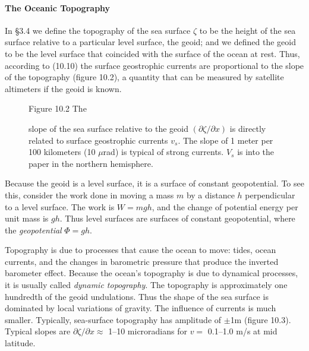 \paragraph{The Oceanic Topography}
In \S 3.4 we define the topography of
the sea surface $\zeta$ to be the height of the sea surface relative
to a particular level surface, the
geoid; and we defined the geoid to be the
level surface that coincided with the surface of
the ocean at rest.  Thus, according to (10.10) the surface geostrophic
currents are proportional to the slope of the topography (figure
10.2), a quantity that can be measured by satellite altimeters if the
geoid is known.

\begin{figure}[h!]
\vspace{-2ex}
\footnotesize
Figure 10.2 The \rule{0mm}{3ex}slope of the sea surface relative to
the geoid $(\partial\zeta/\partial x)$ is directly
related to surface geostrophic currents $v_s$.  The slope of 1 meter
per 100 kilometers (10 $\mu$rad) is typical of strong currents.  $V_s$
is into the paper in the northern hemisphere.
\label{fig:geostrophicsketch}
\vspace{-2ex}
\end{figure}

Because the geoid is a level surface, it is a surface of constant geopotential. To see this,
consider the work done in moving a mass $m$ by a distance $h$
perpendicular to a level surface. The work is
$W=mgh$, and the change of potential energy per unit mass is
$gh$. Thus level surfaces are surfaces of
constant geopotential, where the
\textit{geopotential} $\Phi = gh$.

Topography is due to processes that cause the ocean to move: tides,
ocean currents, and the changes in barometric pressure that produce
the inverted barometer effect. Because the ocean's topography is due
to dynamical processes, it is usually called \textit{dynamic
  topography}. The topography
is approximately one hundredth of the geoid
undulations. Thus the shape of the sea
surface is dominated by local variations of gravity. The influence of
currents is much smaller.  Typically, sea-surface topography has
amplitude of $\pm$1m (figure 10.3). Typical slopes are
$\partial\zeta/\partial x \approx $ 1--10 microradians for $v = $
0.1--1.0 m/s at mid latitude.

